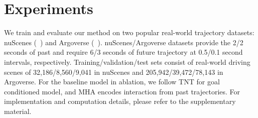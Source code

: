 \documentclass{article} \usepackage{iclr2023_conference,times}
\begin{document}
\section{Experiments}
We train and evaluate our method on two popular real-world trajectory datasets: nuScenes (~\cite{caesar2020nuscenes}) and Argoverse (~\cite{chang2019argoverse}). nuScenes/Argoverse datasets provide the 2/2 seconds of past and require 6/3 seconds of future trajectory at 0.5/0.1 second intervals, respectively.
Training/validation/test sets consist of real-world driving scenes of 32,186/8,560/9,041 in nuScenes and 205,942/39,472/78,143 in Argoverse.
For the baseline model in ablation, we follow TNT for goal conditioned model, and MHA encodes interaction from past trajectories.
For implementation and computation details, please refer to the supplementary material.
\end{document}
